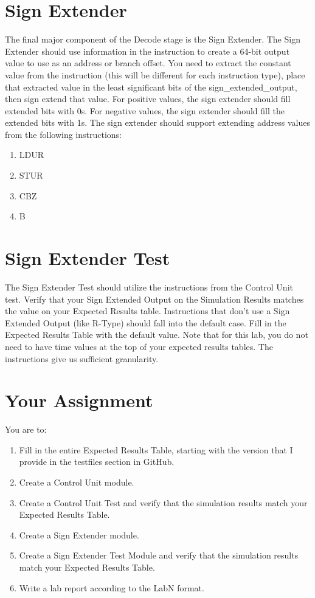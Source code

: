 \section{Sign Extender}
The final major component of the Decode stage is the Sign Extender.  The Sign Extender should use information in the instruction to create a 64-bit output value to use as an address or branch offset.  You need to extract the constant value from the instruction (this will be different for each instruction type), place that extracted value in the least significant bits of the sign\_extended\_output, then sign extend that value.  For positive values, the sign extender should fill extended bits with 0s.  For negative values, the sign extender should fill the extended bits with 1s.  The sign extender should support extending address values from the following instructions:
\begin{enumerate}
	\item LDUR
	\item STUR
	\item CBZ
	\item B
\end{enumerate}

\section{Sign Extender Test}
The Sign Extender Test should utilize the instructions from the Control Unit test.  Verify that your Sign Extended Output on the Simulation Results matches the value on your Expected Results table.  Instructions that don't use a Sign Extended Output (like R-Type) should fall into the default case.  Fill in the Expected Results Table with the default value.   Note that for this lab, you do not need to have time values at the top of your expected results tables.  The instructions give us sufficient granularity.

\clearpage
\section{Your Assignment}

You are to:
\begin{enumerate}
\item Fill in the entire Expected Results Table, starting with the version that I provide in the testfiles section in GitHub.
\item Create a Control Unit module.
\item Create a Control Unit Test and verify that the simulation results match your Expected Results Table.
\item Create a Sign Extender module.
\item Create a Sign Extender Test Module and verify that the simulation results match your Expected Results Table.
\item  Write a lab report according to the LabN format.
\end{enumerate} 